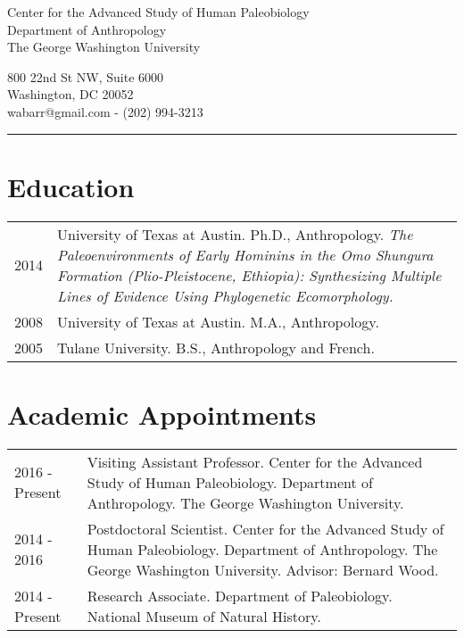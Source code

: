\documentclass{article}
\begin{document}
\begin{center}
\end{center}

\vspace{15pt}

\noindent\begin{minipage}{.60\textwidth}
\begin{flushleft}
Center for the Advanced Study of Human Paleobiology\\
Department of Anthropology\\
The George Washington University\\
\end{flushleft}
\end{minipage}
\begin{minipage}{.395\textwidth}
\begin{flushright}
800 22nd St NW, Suite 6000\\
Washington, DC 20052 \\
wabarr@gmail.com - (202) 994-3213\\
\end{flushright}
\end{minipage}


\noindent\rule[-2mm]{\textwidth}{1pt}

\section*{Education}

\begin{tabular}{p{}p{}}
2014 & University of Texas at Austin. Ph.D., Anthropology. \emph{The Paleoenvironments of Early Hominins in the Omo Shungura Formation (Plio-Pleistocene, Ethiopia): Synthesizing Multiple Lines of Evidence Using Phylogenetic Ecomorphology.}\\[4pt]
2008 & University of Texas at Austin. M.A., Anthropology. \\[4pt]
2005 & Tulane University. B.S., Anthropology and French.\\
\end{tabular}


\section*{Academic Appointments}
\begin{tabular}{p{}p{}}
2016 - Present & Visiting Assistant Professor. Center for the Advanced Study of Human Paleobiology. Department of Anthropology. The George Washington University.\\[4pt]
2014 - 2016 & Postdoctoral Scientist. Center for the Advanced Study of Human Paleobiology. Department of Anthropology. The George Washington University. Advisor: Bernard Wood.\\[4pt]
2014 - Present & Research Associate. Department of Paleobiology.  National Museum of Natural History.\\
\end{tabular}
\end{document}

